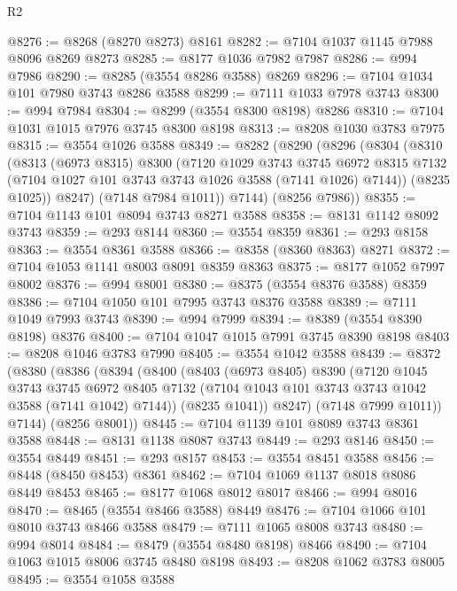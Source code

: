 \begin{lexlean}{R2}
\begin{coremodule}
@8276 := @8268 (@8270 @8273) @8161
@8282 := @7104 @1037 @1145 @7988 @8096 @8269 @8273
@8285 := @8177 @1036 @7982 @7987
@8286 := @994 @7986
@8290 := @8285 (@3554 @8286 @3588) @8269
@8296 := @7104 @1034 @101 @7980 @3743 @8286 @3588
@8299 := @7111 @1033 @7978 @3743
@8300 := @994 @7984
@8304 := @8299 (@3554 @8300 @8198) @8286
@8310 := @7104 @1031 @1015 @7976 @3745 @8300 @8198
@8313 := @8208 @1030 @3783 @7975
@8315 := @3554 @1026 @3588
@8349 := @8282
    (@8290
      (@8296
        (@8304
          (@8310
            (@8313
              (@6973 @8315)
              @8300
              (@7120
                @1029
                @3743
                @3745
                @6972
                @8315
                @7132
                (@7104 @1027 @101 @3743 @3743 @1026 @3588 (@7141 @1026) @7144))
              (@8235 @1025))
            @8247)
          (@7148 @7984 @1011))
        @7144)
      (@8256 @7986))
@8355 := @7104 @1143 @101 @8094 @3743 @8271 @3588
@8358 := @8131 @1142 @8092 @3743
@8359 := @293 @8144
@8360 := @3554 @8359
@8361 := @293 @8158
@8363 := @3554 @8361 @3588
@8366 := @8358 (@8360 @8363) @8271
@8372 := @7104 @1053 @1141 @8003 @8091 @8359 @8363
@8375 := @8177 @1052 @7997 @8002
@8376 := @994 @8001
@8380 := @8375 (@3554 @8376 @3588) @8359
@8386 := @7104 @1050 @101 @7995 @3743 @8376 @3588
@8389 := @7111 @1049 @7993 @3743
@8390 := @994 @7999
@8394 := @8389 (@3554 @8390 @8198) @8376
@8400 := @7104 @1047 @1015 @7991 @3745 @8390 @8198
@8403 := @8208 @1046 @3783 @7990
@8405 := @3554 @1042 @3588
@8439 := @8372
    (@8380
      (@8386
        (@8394
          (@8400
            (@8403
              (@6973 @8405)
              @8390
              (@7120
                @1045
                @3743
                @3745
                @6972
                @8405
                @7132
                (@7104 @1043 @101 @3743 @3743 @1042 @3588 (@7141 @1042) @7144))
              (@8235 @1041))
            @8247)
          (@7148 @7999 @1011))
        @7144)
      (@8256 @8001))
@8445 := @7104 @1139 @101 @8089 @3743 @8361 @3588
@8448 := @8131 @1138 @8087 @3743
@8449 := @293 @8146
@8450 := @3554 @8449
@8451 := @293 @8157
@8453 := @3554 @8451 @3588
@8456 := @8448 (@8450 @8453) @8361
@8462 := @7104 @1069 @1137 @8018 @8086 @8449 @8453
@8465 := @8177 @1068 @8012 @8017
@8466 := @994 @8016
@8470 := @8465 (@3554 @8466 @3588) @8449
@8476 := @7104 @1066 @101 @8010 @3743 @8466 @3588
@8479 := @7111 @1065 @8008 @3743
@8480 := @994 @8014
@8484 := @8479 (@3554 @8480 @8198) @8466
@8490 := @7104 @1063 @1015 @8006 @3745 @8480 @8198
@8493 := @8208 @1062 @3783 @8005
@8495 := @3554 @1058 @3588

\end{coremodule}
\end{lexlean}
